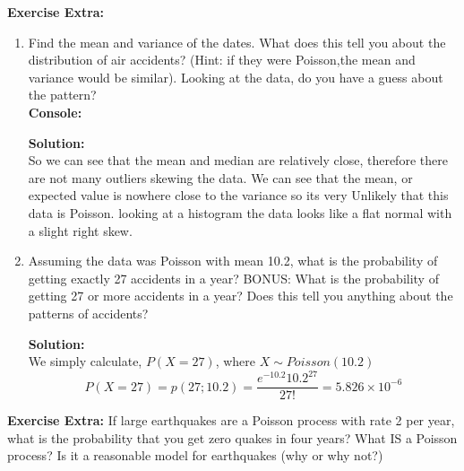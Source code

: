 \documentclass[12pt]{article}
\theoremstyle{homework}
\newcommand{\localhead}[1]{\par\smallskip\noindent\textbf{#1}\nobreak\\}%
\newcommand\solution{\localhead{Solution:}}
\begin{document}
\vspace{.5in}




\hspace{.5in}\textbf{Exercise Extra:} 
\begin{enumerate}
  \item Find the mean and variance of the dates. What does this tell you about the distribution 
  of air accidents? (Hint: if they were Poisson,the mean and variance would be similar). Looking
   at the data, do you have a guess about the pattern?\\
  
  \textbf{Console:}
  

  \solution So we can see that the mean and median are relatively close, therefore there are not many outliers skewing the data.
  We can see that the mean, or expected value is nowhere close to the variance so its very Unlikely that this data is Poisson. looking at a histogram
  the data looks like a flat normal with a slight right skew. 




  \item Assuming the data was Poisson with mean 10.2, what is the probability of getting 
  exactly 27 accidents in a year? BONUS: What is the probability of getting 27 or more 
  accidents in a year? Does this tell you anything about the patterns of accidents?\\
  
  \solution We simply calculate, $P(X = 27)$, where $X \sim Poisson(10.2)$
  \begin{equation*}
    P(X = 27) = p(27;10.2) = \dfrac{e^{-10.2}10.2^{27}}{27!} = 5.826 \times 10^{-6}
  \end{equation*}


\end{enumerate} 
\vspace{.5in}










\hspace{.5in}\textbf{Exercise Extra:} If large earthquakes are a Poisson 
process with rate 2 per year, what is the probability that you get zero 
quakes in four years? What IS a Poisson process? Is it a reasonable model
 for earthquakes (why or why not?)\\
\end{document}
